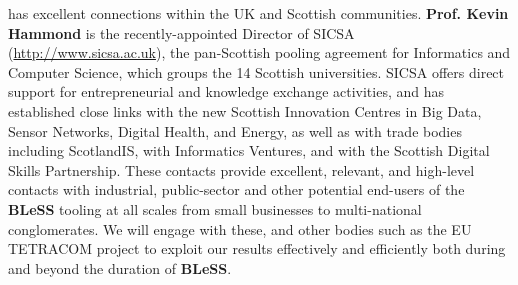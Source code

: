 \documentclass[a4paper,11pt]{article}
\newcommand{\project}[1]{\textbf{#1}\xspace}
\newcommand{\BLESS}{\project{BLeSS}}
\newcommand{\TheProject}{\BLESS}
\begin{document}
\SAshort{} has excellent connections within the UK and Scottish communities.
\textbf{Prof. Kevin Hammond} is the 
recently-appointed Director of SICSA (\url{http://www.sicsa.ac.uk}), the pan-Scottish pooling agreement for Informatics and Computer Science,
which groups the 14 Scottish universities.
SICSA offers direct support for entrepreneurial and knowledge exchange activities,
and has established close links with the new Scottish Innovation Centres in 
Big Data,
Sensor Networks,
Digital Health, 
and Energy,
as well as with trade bodies including ScotlandIS, with Informatics Ventures, and with the Scottish Digital Skills Partnership.
These contacts provide excellent, relevant, and high-level contacts with industrial, public-sector and other potential end-users
of the \TheProject{} tooling at all scales
from small businesses to multi-national conglomerates.
We will engage with these, and other bodies such as the EU TETRACOM project to exploit our results
effectively and efficiently both during and beyond the duration of \TheProject.
\end{document}
